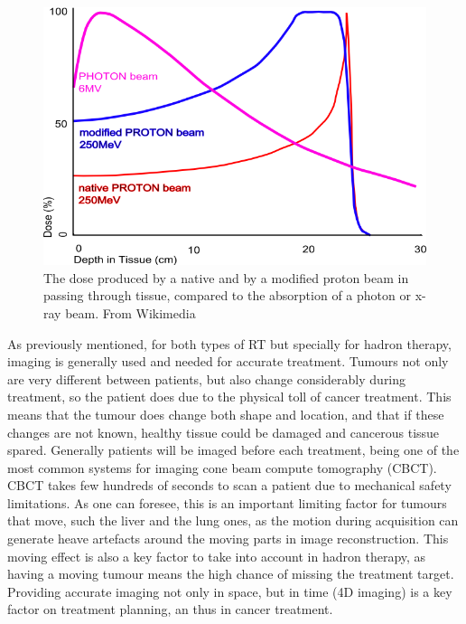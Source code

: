 \begin{figure}[ht]
\begin{center}
\includegraphics[width=0.6\columnwidth]{Introduction/BraggPeak.png}
\caption[Bragg peak]{The dose produced by a native and by a modified proton beam in passing through tissue, compared to the absorption of a photon or x-ray beam. From Wikimedia\cite{bragg}}
\label{fig:bragg}
\end{center}
\end{figure}


As previously mentioned, for both types of RT but specially for hadron therapy, imaging is generally used and needed for accurate treatment. Tumours not only are very different between patients, but also change considerably during treatment, so the patient does due to the physical toll of cancer treatment. This means that the tumour does change both shape and location, and that if these changes are not known, healthy tissue could be damaged and cancerous tissue spared. Generally patients will be imaged before each treatment, being one of the most common systems for imaging cone beam compute tomography (CBCT). CBCT takes few hundreds of seconds to scan a patient due to mechanical safety limitations. As one can foresee, this is an important limiting factor for tumours that move, such the liver and the lung ones, as the motion during acquisition can generate heave artefacts around the moving parts in image reconstruction. This moving effect is also a key factor to take into account in hadron therapy, as having a moving tumour means the high chance of missing the treatment target. Providing accurate imaging not only in space, but in time (4D imaging) is a key factor on treatment planning, an thus in cancer treatment. 

